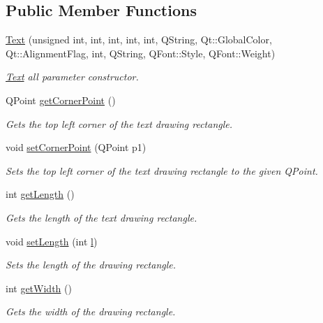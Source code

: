 \subsection*{Public Member Functions}
\begin{DoxyCompactItemize}
\item 
\hyperlink{classText_a2af2490841998a368bccb3eaed6d3698}{Text} (unsigned int, int, int, int, int, Q\+String, Qt\+::\+Global\+Color, Qt\+::\+Alignment\+Flag, int, Q\+String, Q\+Font\+::\+Style, Q\+Font\+::\+Weight)
\begin{DoxyCompactList}\small\item\em \hyperlink{classText}{Text} all parameter constructor. \end{DoxyCompactList}\item 
Q\+Point \hyperlink{classText_a599aa1ac67ad501551a851f2dbc1d90a}{get\+Corner\+Point} ()
\begin{DoxyCompactList}\small\item\em Gets the top left corner of the text drawing rectangle. \end{DoxyCompactList}\item 
void \hyperlink{classText_a8a8424a8e6386a0626cba6ddfa1a91c2}{set\+Corner\+Point} (Q\+Point p1)
\begin{DoxyCompactList}\small\item\em Sets the top left corner of the text drawing rectangle to the given Q\+Point. \end{DoxyCompactList}\item 
int \hyperlink{classText_a0d184f40401d7b4a8127470702bbe1ea}{get\+Length} ()
\begin{DoxyCompactList}\small\item\em Gets the length of the text drawing rectangle. \end{DoxyCompactList}\item 
void \hyperlink{classText_af833cfc1f38ddd0021ac7d1c65f0acb9}{set\+Length} (int \hyperlink{shape__input__file__specs_8txt_a2e02238fe11bc76d2a69c565c7391545}{l})
\begin{DoxyCompactList}\small\item\em Sets the length of the drawing rectangle. \end{DoxyCompactList}\item 
int \hyperlink{classText_aa426e679627149ff986a2c793b2ac71d}{get\+Width} ()
\begin{DoxyCompactList}\small\item\em Gets the width of the drawing rectangle. \end{DoxyCompactList}\item 

\end{DoxyCompactItemize}
